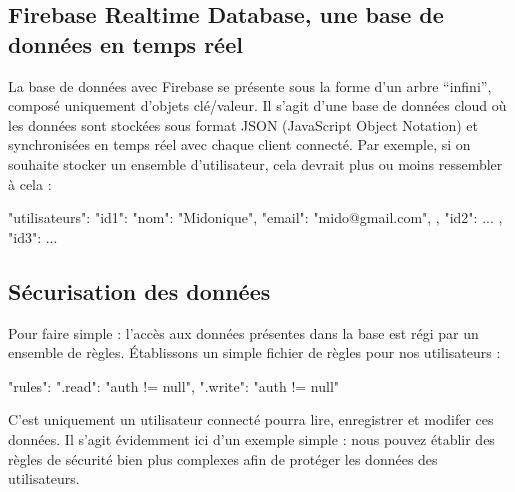 \subsection{Firebase Realtime Database, une base de données en temps réel}
La base de données avec Firebase se présente sous la forme d'un arbre “infini”, composé uniquement d'objets clé/valeur. Il s'agit d'une base de données cloud où les données sont stockées sous format JSON (JavaScript Object Notation) et synchronisées en temps réel avec chaque client connecté. Par exemple, si on souhaite stocker un ensemble d'utilisateur, cela devrait plus ou moins ressembler à cela :

\begin{verbatimtab}[3]
{
	"utilisateurs": {
		"id1": {
			"nom": "Midonique",
			"email": "mido@gmail.com",
		},
		"id2": { ... },
		"id3": { ... }
	}
}
\end{verbatimtab}

\clearpage
\subsection{Sécurisation des données}
Pour faire simple : l'accès aux données présentes dans la base est régi par un ensemble de règles. Établissons un simple fichier de règles pour nos utilisateurs :

\begin{verbatimtab}[3]
{
	"rules": {
		".read": "auth != null",
		".write": "auth != null"
	}
}
\end{verbatimtab}

C'est uniquement un utilisateur connecté pourra lire, enregistrer et modifer ces données. Il s’agit évidemment ici d’un exemple simple : nous pouvez établir des règles de sécurité bien plus complexes afin de protéger les données des utilisateurs.
